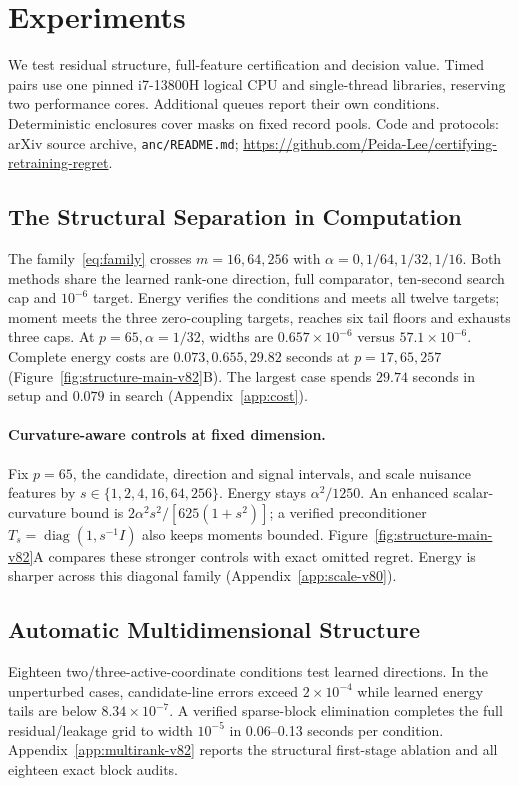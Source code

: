 

\section{Experiments}\label{sec:experiments}
We test residual structure, full-feature certification and decision value. Timed pairs use one pinned i7-13800H logical CPU and single-thread libraries, reserving two performance cores. Additional queues report their own conditions. Deterministic enclosures cover masks on fixed record pools. Code and protocols: arXiv source archive, \texttt{anc/README.md}; \url{https://github.com/Peida-Lee/certifying-retraining-regret}.

\subsection{The Structural Separation in Computation}
The family~\eqref{eq:family} crosses $m=16,64,256$ with $\alpha=0,1/64,1/32,1/16$. Both methods share the learned rank-one direction, full comparator, ten-second search cap and $10^{-6}$ target. Energy verifies the conditions and meets all twelve targets; moment meets the three zero-coupling targets, reaches six tail floors and exhausts three caps. At $p=65,\alpha=1/32$, widths are $0.657\times10^{-6}$ versus $57.1\times10^{-6}$. Complete energy costs are $0.073,0.655,29.82$ seconds at $p=17,65,257$ (Figure~\ref{fig:structure-main-v82}B). The largest case spends $29.74$ seconds in setup and $0.079$ in search (Appendix~\ref{app:cost}).

\paragraph{Curvature-aware controls at fixed dimension.}
Fix $p=65$, the candidate, direction and signal intervals, and scale nuisance features by $s\in\{1,2,4,16,64,256\}$. Energy stays $\alpha^2/1250$. An enhanced scalar-curvature bound is $2\alpha^2s^2/[625(1+s^2)]$; a verified preconditioner $T_s=\operatorname{diag}(1,s^{-1}I)$ also keeps moments bounded. Figure~\ref{fig:structure-main-v82}A compares these stronger controls with exact omitted regret. Energy is sharper across this diagonal family (Appendix~\ref{app:scale-v80}).

\subsection{Automatic Multidimensional Structure}
Eighteen two/three-active-coordinate conditions test learned directions. In the unperturbed cases, candidate-line errors exceed $2\times10^{-4}$ while learned energy tails are below $8.34\times10^{-7}$. A verified sparse-block elimination completes the full residual/leakage grid to width $10^{-5}$ in 0.06--0.13 seconds per condition. Appendix~\ref{app:multirank-v82} reports the structural first-stage ablation and all eighteen exact block audits.

